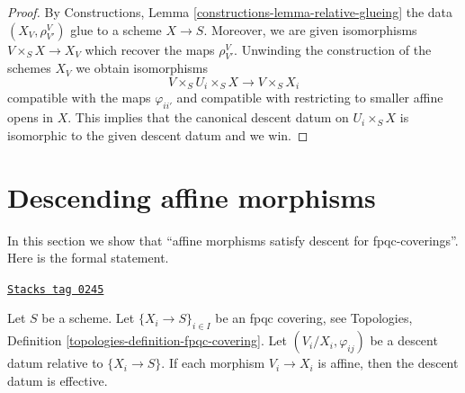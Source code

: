 \begin{proof}
\medskip\noindent
By Constructions, Lemma \ref{constructions-lemma-relative-glueing} the data
$(X_V, \rho^V_{V'})$ glue to a scheme $X \to S$.
Moreover, we are given isomorphisms $V \times_S X \to X_V$
which recover the maps $\rho^V_{V'}$. Unwinding the construction
of the schemes $X_V$ we obtain isomorphisms
$$
V \times_S U_i \times_S X
\longrightarrow
V \times_S X_i
$$
compatible with the maps $\varphi_{ii'}$ and compatible with
restricting to smaller affine opens in $X$. This implies that
the canonical descent datum on $U_i \times_S X$ is isomorphic
to the given descent datum and we win.
\end{proof}

\section{Descending affine morphisms}
\label{descent-section-affine}
In this section we show that
``affine morphisms satisfy descent for fpqc-coverings''.
Here is the formal statement.

\begin{lemma}[Affine]
\label{descent-lemma-affine}
\href{https://stacks.math.columbia.edu/tag/0245}{\texttt{Stacks tag 0245}}

Let $S$ be a scheme.
Let $\{X_i \to S\}_{i\in I}$ be an fpqc covering, see
Topologies, Definition \ref{topologies-definition-fpqc-covering}.
Let $(V_i/X_i, \varphi_{ij})$ be a descent datum
relative to $\{X_i \to S\}$. If each morphism
$V_i \to X_i$ is affine, then the descent datum is
effective.
\end{lemma}

